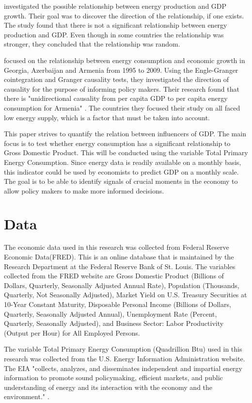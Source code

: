\documentclass[12pt]{article}
\begin{document}
\citet{szustak2021relationship} investigated the possible relationship between energy production and GDP growth. 
Their goal was to discover the direction of the relationship, if one exists. 
The study found that there is not a significant relationship between energy production and GDP. 
Even though in some countries the relationship was stronger, they concluded that the relationship was random. 

\citet{kalyoncu2013causality} focused on the relationship between energy consumption and economic growth in Georgia, Azerbaijan and Armenia from 1995 to 2009. 
Using the Engle-Granger cointegration and Granger causality tests, they investigated the direction of causality for the purpose of informing policy makers. 
Their research found that there is "unidirectional causality from per capita GDP to per capita energy consumption for Armenia" \citet[]{kalyoncu2013causality}.
The countries they focused their study on all faced low energy supply, which is a factor that must be taken into account. 

This paper strives to quantify the relation between influencers of GDP. 
The main focus is to test whether energy consumption has a significant relationship to Gross Domestic Product. 
This will be conducted using the variable Total Primary Energy Consumption. 
Since energy data is readily available on a monthly basis, this indicator could be used by economists to predict GDP on a monthly scale. 
The goal is to be able to identify signals of crucial moments in the economy to allow policy makers to make more informed decisions. 

\section*{Data}
The economic data used in this research was collected from Federal Reserve Economic Data(FRED). 
This is an online database that is maintained by the Research Department at the Federal Reserve Bank of St. Louis. 
The variables collected from the FRED website are Gross Domestic Product (Billions of Dollars, Quarterly, Seasonally Adjusted Annual Rate), Population (Thousands, Quarterly, Not Seasonally Adjusted), Market Yield on U.S. Treasury Securities at 10-Year Constant Maturity, Disposable Personal Income (Billions of Dollars, Quarterly, Seasonally Adjusted Annual), Unemployment Rate (Percent, Quarterly, Seasonally Adjusted), and Business Sector: Labor Productivity (Output per Hour) for All Employed Persons. 

The variable Total Primary Energy Consumption (Quadrillion Btu) used in this research was collected from the U.S. Energy Information Administration website. 
The EIA "collects, analyzes, and disseminates independent and impartial energy information to promote sound policymaking, efficient markets, and public understanding of energy and its interaction with the economy and the environment." \citet[]{eia}.
\end{document}

